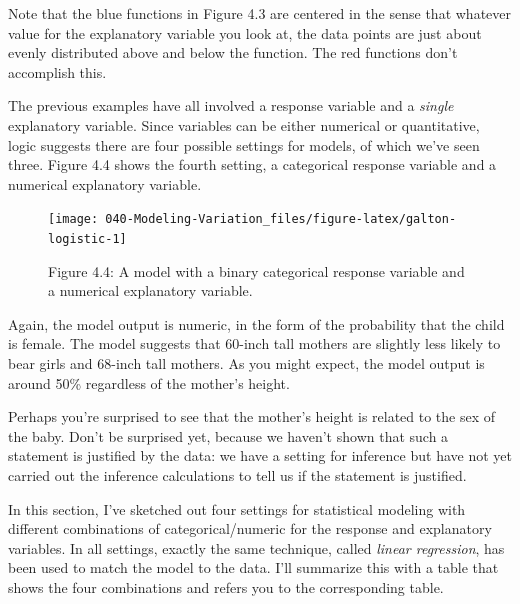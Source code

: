 \documentclass[]{tufte-book}
\begin{document}
Note that the blue functions in Figure 4.3 are centered in the sense that whatever value for the explanatory variable you look at, the data points are just about evenly distributed above and below the function. The red functions don't accomplish this.

The previous examples have all involved a response variable and a \emph{single} explanatory variable. Since variables can be either numerical or quantitative, logic suggests there are four possible settings for models, of which we've seen three. Figure 4.4 shows the fourth setting, a categorical response variable and a numerical explanatory variable.

\begin{figure}\texttt{[image: 040-Modeling-Variation\_files/figure-latex/galton-logistic-1]} \caption[Figure 4.4]{Figure 4.4: A model with a binary categorical response variable and a numerical explanatory variable.}\label{fig:galton-logistic}
\end{figure}

Again, the model output is numeric, in the form of the probability that the child is female. The model suggests that 60-inch tall mothers are slightly less likely to bear girls and 68-inch tall mothers. As you might expect, the model output is around 50\% regardless of the mother's height.

Perhaps you're surprised to see that the mother's height is related to the sex of the baby. Don't be surprised yet, because we haven't shown that such a statement is justified by the data: we have a setting for inference but have not yet carried out the inference calculations to tell us if the statement is justified.

In this section, I've sketched out four settings for statistical modeling with different combinations of categorical/numeric for the response and explanatory variables. In all settings, exactly the same technique, called \emph{linear regression}, has been used to match the model to the data. I'll summarize this with a table that shows the four combinations and refers you to the corresponding table.
\end{document}
